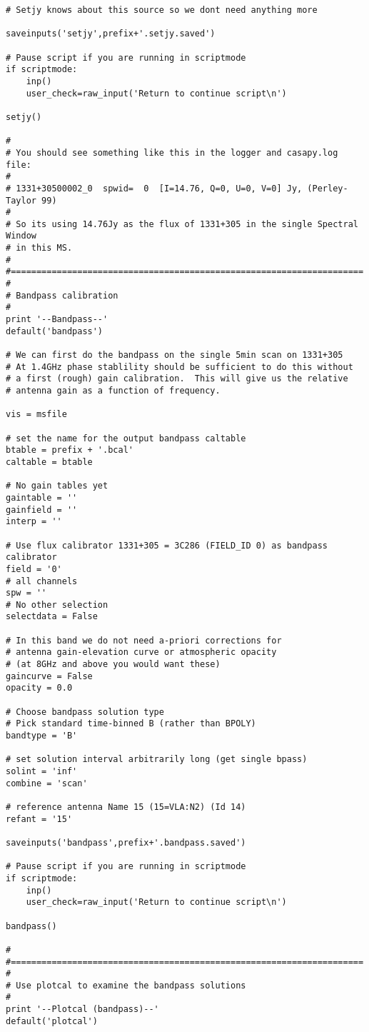 \begin{verbatim}
# Setjy knows about this source so we dont need anything more

saveinputs('setjy',prefix+'.setjy.saved')

# Pause script if you are running in scriptmode
if scriptmode:
    inp()
    user_check=raw_input('Return to continue script\n')

setjy()

#
# You should see something like this in the logger and casapy.log file:
#
# 1331+30500002_0  spwid=  0  [I=14.76, Q=0, U=0, V=0] Jy, (Perley-Taylor 99)
#
# So its using 14.76Jy as the flux of 1331+305 in the single Spectral Window
# in this MS.
#
#=====================================================================
#
# Bandpass calibration
#
print '--Bandpass--'
default('bandpass')

# We can first do the bandpass on the single 5min scan on 1331+305
# At 1.4GHz phase stablility should be sufficient to do this without
# a first (rough) gain calibration.  This will give us the relative
# antenna gain as a function of frequency.

vis = msfile

# set the name for the output bandpass caltable
btable = prefix + '.bcal'
caltable = btable

# No gain tables yet
gaintable = ''
gainfield = ''
interp = ''

# Use flux calibrator 1331+305 = 3C286 (FIELD_ID 0) as bandpass calibrator
field = '0'
# all channels
spw = ''
# No other selection
selectdata = False

# In this band we do not need a-priori corrections for
# antenna gain-elevation curve or atmospheric opacity
# (at 8GHz and above you would want these)
gaincurve = False
opacity = 0.0

# Choose bandpass solution type
# Pick standard time-binned B (rather than BPOLY)
bandtype = 'B'

# set solution interval arbitrarily long (get single bpass)
solint = 'inf'
combine = 'scan'

# reference antenna Name 15 (15=VLA:N2) (Id 14)
refant = '15'

saveinputs('bandpass',prefix+'.bandpass.saved')

# Pause script if you are running in scriptmode
if scriptmode:
    inp()
    user_check=raw_input('Return to continue script\n')

bandpass()

#
#=====================================================================
#
# Use plotcal to examine the bandpass solutions
#
print '--Plotcal (bandpass)--'
default('plotcal')


\end{verbatim}
